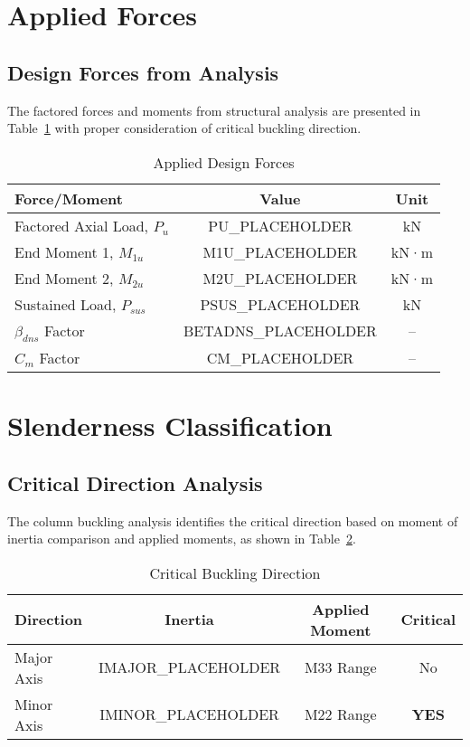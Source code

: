 \documentclass[
  10pt,
  letterpaper,
  twocolumn
]{article}
\begin{document}
\section{Applied Forces}

\subsection{Design Forces from Analysis}

The factored forces and moments from structural analysis are presented in Table~\ref{tab:forces} with proper consideration of critical buckling direction.

\begin{table}[h]
\centering
\caption{Applied Design Forces}
\label{tab:forces}
\begin{tabular}{@{}lcc@{}}
\toprule
\textbf{Force/Moment} & \textbf{Value} & \textbf{Unit} \\
\midrule
Factored Axial Load, $P_u$ & PU_PLACEHOLDER & kN \\
End Moment 1, $M_{1u}$ & M1U_PLACEHOLDER & kN·m \\
End Moment 2, $M_{2u}$ & M2U_PLACEHOLDER & kN·m \\
Sustained Load, $P_{sus}$ & PSUS_PLACEHOLDER & kN \\
$\beta_{dns}$ Factor & BETADNS_PLACEHOLDER & -- \\
$C_m$ Factor & CM_PLACEHOLDER & -- \\
\bottomrule
\end{tabular}
\end{table}

\section{Slenderness Classification}

\subsection{Critical Direction Analysis}

The column buckling analysis identifies the critical direction based on moment of inertia comparison and applied moments, as shown in Table~\ref{tab:buckling}.

\begin{table}[h]
\centering
\caption{Critical Buckling Direction}
\label{tab:buckling}
\begin{tabular}{@{}lccc@{}}
\toprule
\textbf{Direction} & \textbf{Inertia} & \textbf{Applied Moment} & \textbf{Critical} \\
\midrule
Major Axis & IMAJOR_PLACEHOLDER & M33 Range & No \\
Minor Axis & IMINOR_PLACEHOLDER & M22 Range & \textcolor{ghalired}{\textbf{YES}} \\
\bottomrule
\end{tabular}
\end{table}
\end{document}
